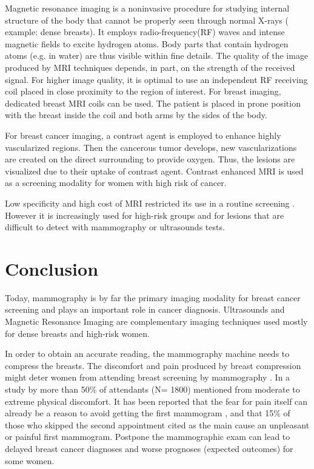 Magnetic resonance imaging is a noninvasive procedure for studying internal structure of the body that cannot be properly seen through normal X-rays ( example: dense breasts).  It employs radio-frequency(RF) waves and intense magnetic fields to excite hydrogen atoms. Body parts that contain hydrogen atoms (e.g. in water) are thus visible within fine details. The quality of the image produced by MRI techniques depends, in part, on the strength of the received signal. For higher image quality, it is optimal to use an independent RF receiving coil placed in close proximity to the region of interest.  For breast imaging, dedicated breast MRI coils can be used. The patient is placed in prone position with the breast inside the coil and both arms by the sides of the body.

For breast cancer imaging,  a contrast agent is employed to enhance highly vascularized regions. Then the cancerous tumor develops, new vascularizations are created on the direct surrounding to provide oxygen. Thus, the lesions are visualized due to their uptake of contrast agent. Contrast enhanced MRI is used as a screening modality for women with high risk of cancer.  

Low specificity and high cost of MRI restricted its use in a routine screening \citep{peters_meta_2008}. However it is increasingly used for high-risk groups and for lesions that are difficult to detect with mammography or ultrasounds tests. 


\section{Conclusion}\label{section:conlusion}
Today, mammography is by far the primary imaging modality for breast cancer screening and plays an important role in cancer diagnosis. Ultrasounds and Magnetic Resonance Imaging are complementary imaging techniques used mostly for dense breasts and high-risk women.
 
In order to obtain an accurate reading, the mammography machine needs to compress the breasts.  The discomfort and pain produced by breast compression might deter women from attending breast screening by mammography \citep{aro_psychosocial_1999,fleming_intermittent_2013}. In a study by \citep{dullum_rates_2000} more than 50\% of attendants (N= 1800) mentioned from moderate to extreme physical discomfort.  It has been reported that the
fear for pain itself can already be a reason to avoid getting the first mammogram \citep{andrews_pain_2001}, and that 15\% of those who skipped the second appointment cited as the main cause an unpleasant or painful first mammogram\citep{fleming_intermittent_2013,whelehan_effect_2013}.  Postpone the mammographic exam can lead to delayed breast cancer diagnoses and worse prognoses (expected outcomes) for some women.

